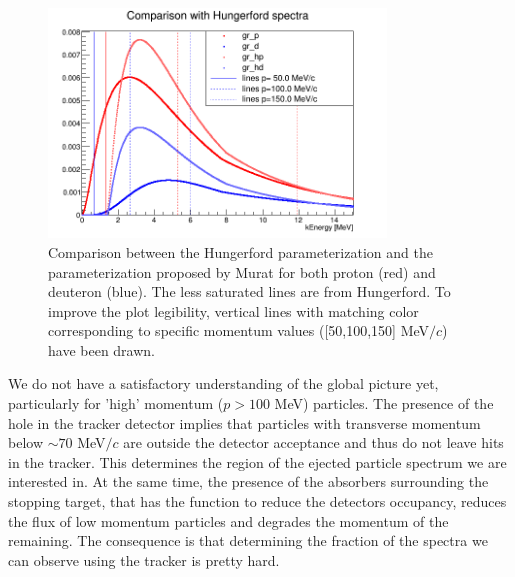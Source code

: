 \documentclass[12pt,a4paper,openright, oneside, titlepage]{book} %
\begin{document}
\begin{figure}[h!]
\centering
\includegraphics[width =0.8\textwidth, keepaspectratio]{new_spectra_2/comparison2}
\caption{Comparison \cite{io:comparison} between the Hungerford parameterization \cite{Hungerford} 
and the parameterization proposed by Murat \cite{Pasha:spectra} for both proton (red) and deuteron (blue). 
The less saturated lines are from Hungerford. 
To improve the plot legibility, 
vertical lines with matching color corresponding to specific momentum values ([50,100,150] MeV$/c$) have been drawn.}
\label{_comparison2}
\end{figure}

\noindent 
We do not have a satisfactory understanding of the global picture yet, 
particularly for 'high' momentum ($p>100$ MeV) particles.
The presence of the hole in the tracker detector implies 
that particles with transverse momentum below $\sim70$ MeV$/c$
are outside the detector acceptance and thus 
do not leave hits in the tracker. 
This determines the region of the ejected particle spectrum we are interested in. 
At the same time, the presence of the absorbers surrounding the stopping target, 
that has the function to reduce the detectors occupancy, 
reduces the flux of low momentum particles and degrades the momentum of the remaining. 
The consequence is that determining the fraction of the spectra we can observe using the tracker 
is pretty hard.\\ 
\end{document}
